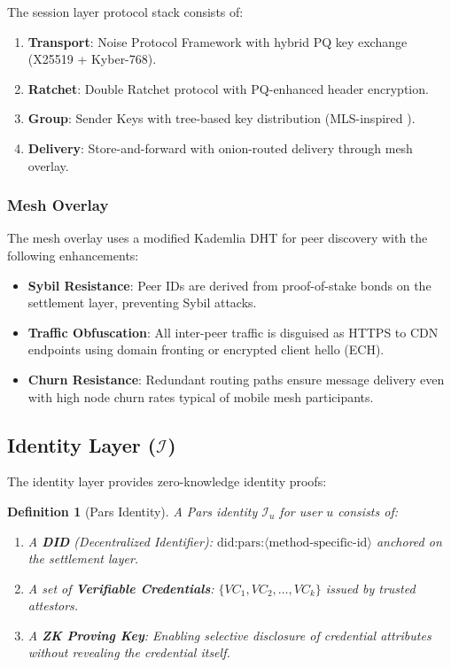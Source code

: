 \documentclass[11pt,a4paper,twocolumn]{article}
\newtheorem{definition}[theorem]{Definition}
\begin{document}
The session layer protocol stack consists of:

\begin{enumerate}[leftmargin=*]
  \item \textbf{Transport}: Noise Protocol Framework \cite{perrin2018noise} with hybrid PQ key exchange (X25519 + Kyber-768).
  \item \textbf{Ratchet}: Double Ratchet protocol \cite{marlinspike2016double} with PQ-enhanced header encryption.
  \item \textbf{Group}: Sender Keys with tree-based key distribution (MLS-inspired \cite{barnes2023mls}).
  \item \textbf{Delivery}: Store-and-forward with onion-routed delivery through mesh overlay.
\end{enumerate}

\subsubsection{Mesh Overlay}

The mesh overlay uses a modified Kademlia DHT \cite{maymounkov2002kademlia} for peer discovery with the following enhancements:

\begin{itemize}[leftmargin=*]
  \item \textbf{Sybil Resistance}: Peer IDs are derived from proof-of-stake bonds on the settlement layer, preventing Sybil attacks.
  \item \textbf{Traffic Obfuscation}: All inter-peer traffic is disguised as HTTPS to CDN endpoints using domain fronting or encrypted client hello (ECH).
  \item \textbf{Churn Resistance}: Redundant routing paths ensure message delivery even with high node churn rates typical of mobile mesh participants.
\end{itemize}

\subsection{Identity Layer ($\mathcal{I}$)}

The identity layer provides zero-knowledge identity proofs:

\begin{definition}[Pars Identity]
A Pars identity $\mathcal{I}_u$ for user $u$ consists of:
\begin{enumerate}
  \item A \textbf{DID} (Decentralized Identifier): $\text{did:pars:}\langle\text{method-specific-id}\rangle$ anchored on the settlement layer.
  \item A set of \textbf{Verifiable Credentials}: $\{VC_1, VC_2, \ldots, VC_k\}$ issued by trusted attestors.
  \item A \textbf{ZK Proving Key}: Enabling selective disclosure of credential attributes without revealing the credential itself.
\end{enumerate}
\end{definition}
\end{document}
